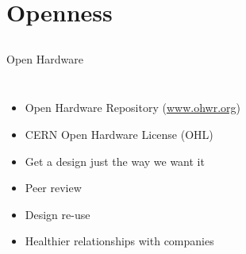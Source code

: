 \documentclass[compress,red]{beamer}
\begin{document}
\section{Openness}
\subsection{}
\begin{frame}{Open Hardware}

  \begin{columns}[c]

      \begin{itemize}
        \item Open Hardware Repository (\href{http://ohwr.org}{www.ohwr.org})
	\item CERN Open Hardware License (OHL)
	\item Get a design just the way we want it
	\item Peer review
	\item Design re-use
	\item Healthier relationships with companies
      \end{itemize}



\end{columns}
\end{frame}
\end{document}
